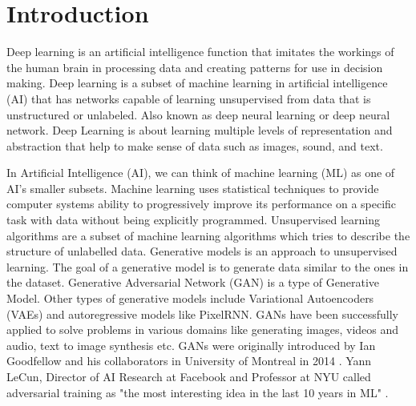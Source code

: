 \chapter{Introduction}
    Deep learning is an artificial intelligence function that imitates the workings of the human brain in processing data and creating patterns for use in decision making. Deep learning is a subset of machine learning in artificial intelligence (AI) that has networks capable of learning unsupervised from data that is unstructured or unlabeled. Also known as deep neural learning or deep neural network. Deep Learning is about learning multiple levels of representation and abstraction that help to make sense of data such as images, sound, and text.
\par
     In Artificial Intelligence (AI), we can think of machine learning (ML) as one of AI’s smaller subsets. Machine learning uses statistical techniques to provide computer systems ability to progressively improve its performance on a specific task with data without being explicitly programmed. Unsupervised learning algorithms are a subset of machine learning algorithms which tries to describe the structure of unlabelled data. Generative models is an approach to unsupervised learning. The goal of a generative model is to generate data similar to the ones in the dataset. Generative Adversarial Network (GAN) is a type of Generative Model. Other types of generative models include Variational Autoencoders (VAEs) and autoregressive models like PixelRNN. GANs have been successfully applied to solve problems in various domains like generating images, videos and audio, text to image synthesis etc. GANs were originally introduced by Ian Goodfellow and his collaborators in University of Montreal in 2014 . Yann LeCun, Director of AI Research at Facebook and Professor at NYU called adversarial training as "the most interesting idea in the last 10 years in ML" . 
\par
    
